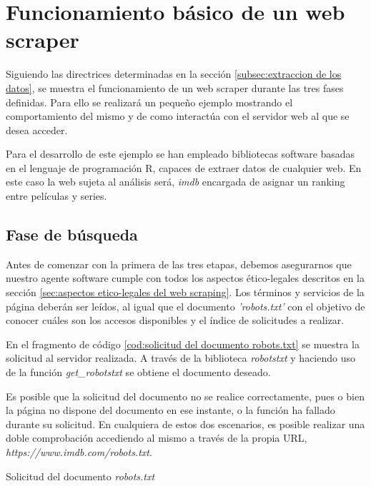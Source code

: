 \chapter{Funcionamiento básico de un web scraper}
\label{cha:funcionamiento basico de un web scraper}

Siguiendo las directrices determinadas en la sección \ref{subsec:extraccion de los datos}, se
muestra el funcionamiento de un web scraper durante las tres fases definidas. Para ello se realizará un
pequeño ejemplo mostrando el comportamiento del mismo y de como interactúa con el servidor web al que
se desea acceder.

Para el desarrollo de este ejemplo se han empleado bibliotecas software basadas en el lenguaje de
programación R, capaces de extraer datos de cualquier web. En este caso la web sujeta al análisis será,
\emph{imdb} encargada de asignar un ranking entre películas y series.

\section{Fase de búsqueda}
\label{sec:fase de busqueda}

Antes de comenzar con la primera de las tres etapas, debemos asegurarnos que nuestro agente software
cumple con todos los aspectos ético-legales descritos en la sección \ref{sec:aspectos etico-legales del web
scraping}. Los términos y servicios de la página deberán ser leídos, al igual que el documento
\emph{'robots.txt'} con el objetivo de conocer cuáles son los accesos disponibles y el índice de solicitudes
a realizar.

En el fragmento de código \ref{cod:solicitud del documento robots.txt} se muestra la solicitud al servidor
realizada. A través de la biblioteca \emph{robotstxt} \cite{robotstxt-cran} y haciendo uso de la función
\emph{get\_robotstxt} se obtiene el documento deseado.

Es posible que la solicitud del documento no se realice correctamente, pues o bien la página no dispone
del documento en ese instante, o la función ha fallado durante su solicitud. En cualquiera de estos dos
escenarios, es posible realizar una doble comprobación accediendo al mismo a través de la propia URL,
\emph{https://www.imdb.com/robots.txt}.

\begin{codefloat}

\caption{Solicitud del documento \emph{robots.txt}}
\label{cod:solicitud del documento robots.txt}
\end{codefloat}

